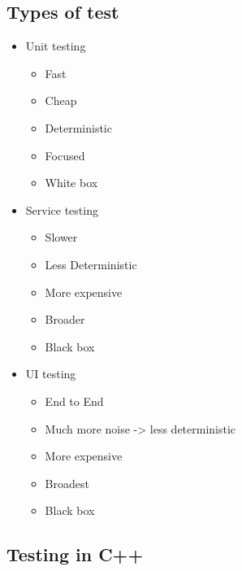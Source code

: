 \documentclass{report}
\begin{document}
\subsection{Types of test}

\begin{itemize}
	\item Unit testing
	      \begin{itemize}
		      \item Fast
		      \item Cheap
		      \item Deterministic
		      \item Focused
		      \item White box
	      \end{itemize}
	\item Service testing
	      \begin{itemize}
		      \item Slower
		      \item Less Deterministic
		      \item More expensive
		      \item Broader
		      \item Black box
	      \end{itemize}
	\item UI testing
	      \begin{itemize}
		      \item End to End
		      \item Much more noise -> less deterministic
		      \item More expensive
		      \item Broadest
		      \item Black box
	      \end{itemize}
\end{itemize}

\subsection{Testing in C++}
\end{document}
